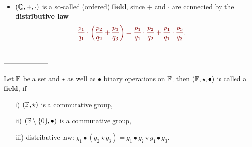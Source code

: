{\begin{frame}
\begin{itemize}
		\item $({\mathbb{Q}},+, \cdot)$ is a so-called (ordered) \textbf{field}, since $+$ and $\cdot$ are connected by the \textbf{distributive law}
		\[\color{satzrot}
		\frac{p_1}{q_1}\cdot \left(\frac{p_2}{q_2}+\frac{p_3}{q_3}\right)=
		\frac{p_1}{q_1}\cdot \frac{p_2}{q_2}+\frac{p_1}{q_1}\cdot \frac{p_3}{q_3}.
		\]	
	\end{itemize}
	\vspace{0.8cm}
	\small
	--------------------------------------------------------------------------------------------------------------------------------\\
	\vspace{-0.3cm}
	\begin{defi}[Field]\label{def:field} 
		Let ${\mathbb{F}}$ be a set and $\star$ as well as $\bullet$  binary operations on ${\mathbb{F}}$, then $({\mathbb{F}}, \star, \bullet)$ is called a \textbf{field}, if
		\begin{itemize}
			\item[i)] $({\mathbb{F}}, \star)$ is a commutative group,
			\item[ii)] $({\mathbb{F}}\setminus \{0\}, \bullet)$ is a commutative group,
			\item[iii)] distributive law: $g_1 \bullet ( g_2 \star g_3) =g_1 \bullet  g_2 \star g_1 \bullet  g_3$.
		\end{itemize}
	\end{defi}
\end{frame}

}
